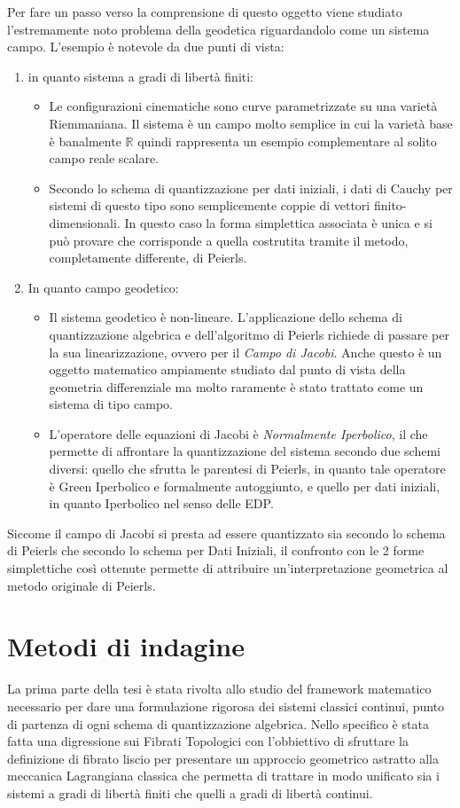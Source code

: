 \documentclass[11pt]{article}
\begin{document}
Per fare un passo verso la comprensione di questo oggetto viene studiato l’estremamente noto problema della geodetica riguardandolo come un sistema campo.
L'esempio è notevole da due punti di vista:
\begin{enumerate}
	\item in quanto sistema a gradi di libertà finiti:
	\begin{itemize}
		\item Le configurazioni cinematiche sono curve parametrizzate su una varietà Riemmaniana. Il sistema è un campo molto semplice in cui la varietà base è banalmente $\mathbb{R}$ quindi rappresenta un esempio complementare al solito campo reale scalare.
		\item Secondo lo schema di quantizzazione per dati iniziali, i dati di Cauchy per sistemi di 	questo tipo sono semplicemente coppie di vettori finito-dimensionali. In questo caso la forma simplettica associata è unica e si può provare che corrisponde a quella costrutita tramite il metodo, completamente differente, di Peierls.
	\end{itemize}

	\item In quanto campo geodetico:
	\begin{itemize}
		\item Il sistema geodetico è non-lineare. L'applicazione dello schema di quantizzazione algebrica e dell'algoritmo di Peierls richiede di passare per la sua linearizzazione, ovvero per il  \emph{Campo di Jacobi}. 
		Anche questo è un oggetto matematico ampiamente studiato dal punto di vista della geometria differenziale ma molto raramente è stato trattato come un sistema di tipo campo. 
		\item L'operatore delle equazioni di Jacobi è \emph{Normalmente Iperbolico}, il che permette di affrontare la quantizzazione del sistema secondo due schemi diversi: quello che sfrutta le parentesi di Peierls, in quanto tale operatore è Green Iperbolico e formalmente autoggiunto, e quello per dati iniziali, in quanto Iperbolico nel senso delle EDP.
	\end{itemize}
\end{enumerate}

Siccome il campo di Jacobi si presta ad essere quantizzato  sia secondo lo schema di Peierls che secondo lo schema per Dati Iniziali, il confronto con le 2 forme simplettiche così ottenute permette di attribuire un'interpretazione geometrica al metodo originale di Peierls.

\section{Metodi di indagine}
La prima parte della tesi è stata rivolta allo studio del framework matematico necessario per dare una formulazione rigorosa dei sistemi classici continui, punto di partenza di ogni schema di quantizzazione algebrica.
Nello specifico è stata fatta una digressione sui Fibrati Topologici con l'obbiettivo di sfruttare la definizione di fibrato liscio per presentare un approccio geometrico astratto alla meccanica Lagrangiana classica che permetta di trattare in modo unificato sia i sistemi a gradi di libertà finiti che quelli a gradi di libertà continui.
\end{document}
